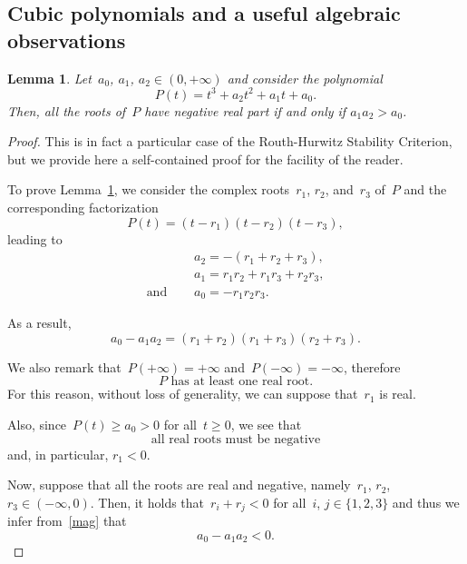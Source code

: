 \documentclass[12pt]{amsart}
\numberwithin{equation}{section}
\newtheorem{lemma}[theorem]{Lemma}
\renewcommand{\ge}{\geqslant}
\begin{document}
\begin{appendix}

\section{Cubic polynomials and a useful algebraic observations}\label{APP;a}

\begin{lemma}\label{LE:A}
Let~$a_0$, $a_1$, $a_2\in(0,+\infty)$ and consider the polynomial $$P(t) = t^3 + a_2 t^2 + a_1 t + a_0.$$ Then, all the roots of~$P$ have negative real part if and only if $a_1 a_2 > a_0 $.
\end{lemma}

\begin{proof}
This is in fact a particular case of the Routh-Hurwitz Stability Criterion, but we provide
here a self-contained proof for the facility of the reader.

To prove Lemma~\ref{LE:A}, we consider the complex roots~$r_1$, $r_2$, and~$r_3$ of~$P$
and the corresponding factorization
$$P(t)=(t-r_1)(t-r_2)(t-r_3),$$
leading to
\begin{equation*}
\begin{split}&
a_2=-(r_1+  r_2 + r_3) ,\\&
a_1=r_1 r_2 + r_1 r_3 + r_2 r_3 , \\ {\mbox{and }}\quad&a_0=-r_1 r_2 r_3 .
\end{split}\end{equation*}

As a result,
\begin{equation}\label{mag}
a_0-a_1a_2=(r_1 + r_2) (r_1 + r_3) (r_2 + r_3).
\end{equation}

We also remark that~$P(+\infty)=+\infty$ and~$P(-\infty)=-\infty$, therefore
\begin{equation}\label{ser.pqkdoewvnb9m87}
{\mbox{$P$ has at least one real root.}}\end{equation} For this reason, without loss of generality, we can suppose that~$r_1$ is real.

Also, since~$P(t)\ge a_0>0$ for all~$t\ge0$, we see that
\begin{equation}\label{ser}
{\mbox{all real roots must be negative}}\end{equation} and, in particular, $r_1<0$.

Now, suppose that all the roots are real and negative,
namely~$r_1$, $r_2$, $r_3\in(-\infty,0)$.
Then, it holds that~$r_i+r_j<0$ for all~$i$, $j\in\{1,2,3\}$ and thus
we infer from~\eqref{mag} that
\begin{equation}\label{Swq90nc79m0bv37}
a_0-a_1a_2<0.\end{equation}


\end{proof}
\end{appendix}
\end{document}
